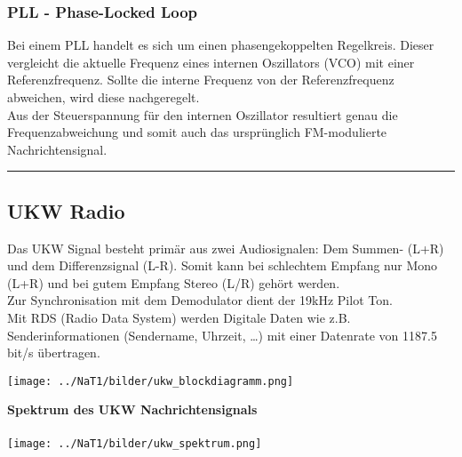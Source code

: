 \subsubsection{PLL - Phase-Locked Loop}
Bei einem PLL handelt es sich um einen phasengekoppelten Regelkreis. Dieser vergleicht die
aktuelle Frequenz eines internen Oszillators (VCO) mit einer Referenzfrequenz. Sollte die
interne Frequenz von der Referenzfrequenz abweichen, wird diese nachgeregelt. \\
Aus der Steuerspannung für den internen Oszillator resultiert genau die Frequenzabweichung und
somit auch das ursprünglich FM-modulierte Nachrichtensignal.\\

\hrule
\subsection{UKW Radio}
Das UKW Signal besteht primär aus zwei Audiosignalen: Dem Summen- (L+R) und dem Differenzsignal (L-R).
Somit kann bei schlechtem Empfang nur Mono (L+R) und bei gutem Empfang Stereo (L/R) gehört werden. \\
Zur Synchronisation mit dem Demodulator dient der 19kHz Pilot Ton. \\
Mit RDS (Radio Data System) werden Digitale Daten wie z.B. Senderinformationen (Sendername, Uhrzeit,
\ldots) mit einer Datenrate von 1187.5 bit/s übertragen. \\
\begin{minipage}{9cm}
	\texttt{[image: ../NaT1/bilder/ukw\_blockdiagramm.png]}
\end{minipage}
\begin{minipage}{9cm} 
	\textbf{Spektrum des UKW Nachrichtensignals} \\ \\
    \texttt{[image: ../NaT1/bilder/ukw\_spektrum.png]}
\end{minipage}